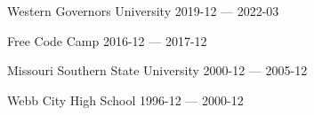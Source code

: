 


\begin{cventries}

  \cventry
    {} %
    {Western Governors University} %
    {} %
    {2019-12 — 2022-03} %
    {}


  \cventry
    {} %
    {Free Code Camp} %
    {} %
    {2016-12 — 2017-12} %
    {}


  \cventry
    {} %
    {Missouri Southern State University} %
    {} %
    {2000-12 — 2005-12} %
    {}


  \cventry
    {} %
    {Webb City High School} %
    {} %
    {1996-12 — 2000-12} %
    {}


\end{cventries}

